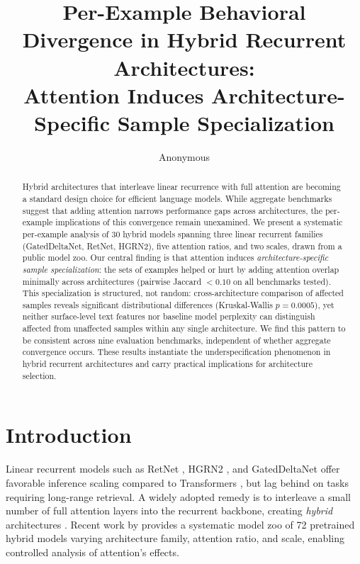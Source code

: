 \documentclass[11pt,a4paper]{article}
\title{Per-Example Behavioral Divergence in Hybrid Recurrent Architectures:\\Attention Induces Architecture-Specific Sample Specialization}
\author{Anonymous}
\date{}
\begin{document}
\maketitle

\begin{abstract}
Hybrid architectures that interleave linear recurrence with full attention are becoming a standard design choice for efficient language models. While aggregate benchmarks suggest that adding attention narrows performance gaps across architectures, the per-example implications of this convergence remain unexamined. We present a systematic per-example analysis of 30 hybrid models spanning three linear recurrent families (GatedDeltaNet, RetNet, HGRN2), five attention ratios, and two scales, drawn from a public model zoo. Our central finding is that attention induces \emph{architecture-specific sample specialization}: the sets of examples helped or hurt by adding attention overlap minimally across architectures (pairwise Jaccard $< 0.10$ on all benchmarks tested). This specialization is structured, not random: cross-architecture comparison of affected samples reveals significant distributional differences (Kruskal-Wallis $p = 0.0005$), yet neither surface-level text features nor baseline model perplexity can distinguish affected from unaffected samples within any single architecture. We find this pattern to be consistent across nine evaluation benchmarks, independent of whether aggregate convergence occurs. These results instantiate the underspecification phenomenon in hybrid recurrent architectures and carry practical implications for architecture selection.
\end{abstract}

\section{Introduction}

Linear recurrent models such as RetNet \citep{sun2023retnet}, HGRN2 \citep{qin2024hgrn2}, and GatedDeltaNet \citep{yang2024gated} offer favorable inference scaling compared to Transformers \citep{vaswani2017attention}, but lag behind on tasks requiring long-range retrieval. A widely adopted remedy is to interleave a small number of full attention layers into the recurrent backbone, creating \emph{hybrid} architectures \citep{wang2025mamba}. Recent work by \citet{wang2025mamba} provides a systematic model zoo of 72 pretrained hybrid models varying architecture family, attention ratio, and scale, enabling controlled analysis of attention's effects.
\end{document}
